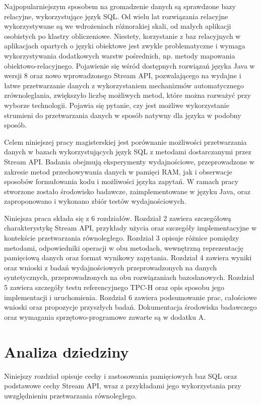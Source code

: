 \documentclass[12pt,twoside,openright]{extarticle}
\begin{document}
    Najpopularniejszym sposobem na gromadzenie danych są sprawdzone bazy relacyjne, wykorzystujące język SQL. Od wielu lat rozwiązania relacyjne wykorzystywane są we wdrożeniach różnorakiej skali, od małych aplikacji osobistych po klastry obliczeniowe. Niestety, korzystanie z baz relacyjnych w aplikacjach opartych o języki obiektowe jest zwykle problematyczne i wymaga wykorzystywania dodatkowych warstw pośrednich, np. metody mapowania obiektowo-relacyjnego. Pojawienie się wśród dostępnych rozwiązań języka Java w wersji 8 oraz nowo wprowadzonego Stream API, pozwalającego na wydajne i łatwe przetwarzanie danych z wykorzystaniem mechanizmów automatycznego zrównoleglania, zwiększyło liczbę możliwych metod, które można rozważyć przy wyborze technologii. Pojawia się pytanie, czy jest możliwe wykorzystanie strumieni do przetwarzania danych w sposób natywny dla języka w podobny sposób.

	Celem niniejszej pracy magisterskiej jest porównanie możliwości przetwarzania danych w bazach wykorzystujących język SQL z metodami dostarczanymi przez Stream API. Badania obejmują eksperymenty wydajnościowe, przeprowadzone w zakresie metod przechowywania danych w pamięci RAM, jak i obserwacje sposobów formułowania kodu i możliwości języka zapytań. W ramach pracy stworzone zostało środowisko badawcze, zaimplementowane w języku Java, oraz zaproponowano i wykonano zbiór testów wydajnościowych.

    Niniejsza praca składa się z 6 rozdziałów. Rozdział 2 zawiera szczegółową charakterystykę Stream API, przykłady użycia oraz szczegóły implementacyjne w kontekście przetwarzania równoległego. Rozdział 3 opisuje różnice pomiędzy metodami, odpowiedniki operacji w obu metodach, wewnętrzną reprezentację pamięciową danych oraz format wynikowy zapytania. Rozdział 4 zawiera wyniki oraz wnioski z badań wydajnościowych przeprowadzonych na danych syntetycznych, przeprowadzonych na obu rozwiązaniach bazodanowych. Rozdział 5 zawiera szczegóły testu referencyjnego TPC-H oraz opis sposobu jego implementacji i uruchomienia. Rozdział 6 zawiera podsumowanie prac, całościowe wnioski oraz propozycje przyszłych badań. Dokumentacja środowiska badawczego oraz wymagania sprzętowo-programowe zawarte są w dodatku A.

\cleardoublepage
\section{Analiza dziedziny}
    Niniejszy rozdział opisuje cechy i zastosowania pamięciowych baz SQL oraz podstawowe cechy Stream API, wraz z przykładami jego wykorzystania przy uwzględnieniu przetwarzania równoległego.
\end{document}
